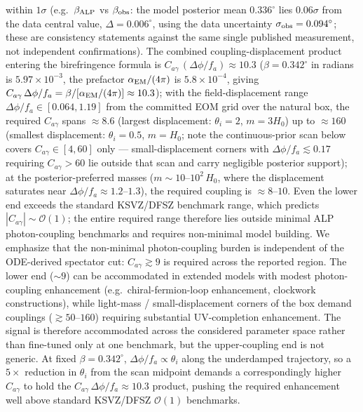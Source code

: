 \documentclass[aps,prd,twocolumn,superscriptaddress,showpacs,preprintnumbers,nofootinbib,longbibliography,floatfix]{revtex4-2}
\begin{document}
within $1\sigma$ (e.g.\ $\beta_{\rm ALP}$ vs $\beta_{\rm obs}$: the model
posterior mean $0.336^\circ$ lies $0.06\sigma$ from the data central value,
$\Delta=0.006^\circ$, using the data uncertainty $\sigma_{\rm obs}=0.094^\circ$;
these are consistency statements against the same single
published measurement, not independent confirmations). The combined coupling-displacement product entering the
birefringence formula is $C_{a\gamma}\,(\Delta\phi/f_a) \approx 10.3$
($\beta = 0.342^\circ$ in radians is $5.97\times 10^{-3}$, the prefactor
$\alpha_{\rm EM}/(4\pi)$ is $5.8\times 10^{-4}$, giving
$C_{a\gamma}\,\Delta\phi/f_a = \beta/[\alpha_{\rm EM}/(4\pi)] \approx 10.3$);
with the field-displacement range $\Delta\phi/f_a \in [0.064, 1.19]$ from the
committed EOM grid over the natural box, the required $C_{a\gamma}$ spans
${\approx}8.6$ (largest displacement: $\theta_i=2$, $m=3H_0$) up to
${\approx}160$ (smallest displacement: $\theta_i=0.5$, $m=H_0$; note the
continuous-prior scan below covers $C_{a\gamma}\in[4,60]$ only ---
small-displacement corners with $\Delta\phi/f_a \lesssim 0.17$ requiring
$C_{a\gamma}>60$ lie outside that scan and carry negligible posterior
support); at the
posterior-preferred masses ($m\sim 10$--$10^2\,H_0$, where the displacement
saturates near $\Delta\phi/f_a\approx 1.2$--$1.3$), the required coupling
is ${\approx}8$--$10$. Even the lower end exceeds the standard KSVZ/DFSZ
benchmark range, which predicts $|C_{a\gamma}|\sim\mathcal{O}(1)$; the
entire required range therefore lies outside minimal ALP photon-coupling
benchmarks and requires non-minimal model building. We emphasize that
the non-minimal photon-coupling burden is independent of the ODE-derived
spectator cut: $C_{a\gamma}\gtrsim9$ is required across the reported region.
The lower end
($\sim 9$) can be accommodated in extended models with modest
photon-coupling enhancement (e.g.\ chiral-fermion-loop enhancement,
clockwork constructions), while light-mass / small-displacement corners
of the box demand couplings ($\gtrsim 50$--$160$) requiring substantial
UV-completion enhancement. The signal is therefore accommodated
across the considered parameter space rather than fine-tuned only at one
benchmark, but the upper-coupling end is not generic. At fixed $\beta=0.342^\circ$,
$\Delta\phi/f_a\propto\theta_i$ along the underdamped trajectory, so a
$5\times$ reduction in $\theta_i$ from the scan midpoint demands a
correspondingly higher $C_{a\gamma}$ to hold the
$C_{a\gamma}\,\Delta\phi/f_a\approx 10.3$ product, pushing the required
enhancement well above standard KSVZ/DFSZ $\mathcal{O}(1)$ benchmarks.
\end{document}
